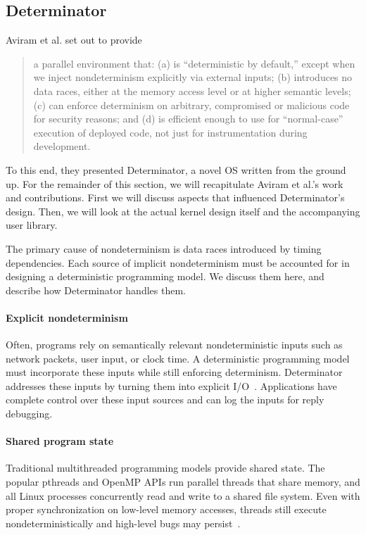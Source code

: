 \subsection{Determinator}
\label{sec:four-nondet}

Aviram et al. set out to provide
\begin{quote}
a parallel environment that:
(a) is ``deterministic by default,'' except when
we inject nondeterminism explicitly via external inputs;
(b) introduces no data races, either at the memory access level
or at higher semantic levels; (c)
can enforce determinism on arbitrary, compromised or
malicious code for security reasons; and (d) is efficient
enough to use for ``normal-case'' execution of deployed
code, not just for instrumentation during development. \cite{Aviram10}
\end{quote}

To this end, they presented Determinator, a novel OS written from the ground up.
For the remainder of this section, we will recapitulate Aviram et al.'s
work and contributions. First we will discuss aspects that influenced
Determinator's design. Then, we will look at the actual kernel design itself
and the accompanying user library.

The primary cause of nondeterminism is data races introduced by timing
dependencies. Each source of implicit nondeterminism must be accounted for in
designing a deterministic programming model. We discuss them here, and describe
how Determinator handles them.

\paragraph{Explicit nondeterminism}
Often, programs rely on semantically relevant nondeterministic inputs such as
network packets, user input, or clock time. A deterministic programming model
must incorporate these inputs while still enforcing determinism. Determinator
addresses these inputs by turning them into explicit I/O~\cite{Aviram10}.
Applications have complete control over these input sources and can log the
inputs for reply debugging.

\paragraph{Shared program state}
Traditional multithreaded programming models provide shared state. The popular
pthreads and OpenMP APIs run parallel threads that share memory, and all
Linux processes concurrently read and write to a shared file system. 
Even with proper synchronization on low-level memory accesses, threads still
execute nondeterministically and high-level bugs may
persist~\cite{artho2003high}.

